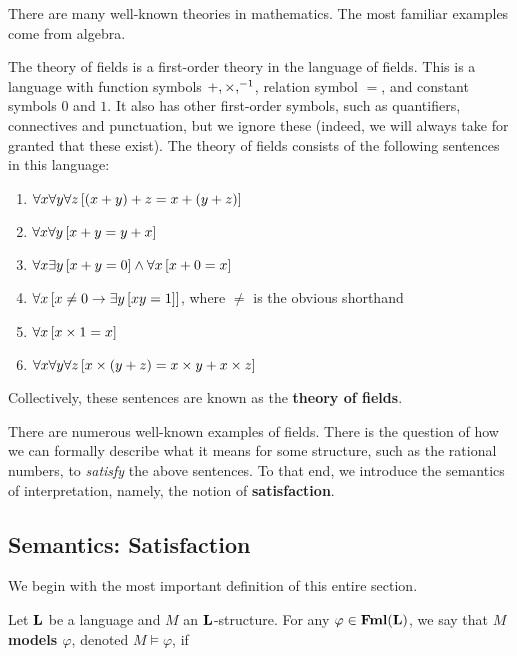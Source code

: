 There are many well-known theories in mathematics. The most familiar examples come from algebra.

\begin{boxexample}\label{Ch1:Eg:Thy_of_Fields}
    The theory of fields is a first-order theory in the language of fields. This is a language with function symbols $+, \times, ^{-1}$, relation symbol $=$, and constant symbols $0$ and $1$. It also has other first-order symbols, such as quantifiers, connectives and punctuation, but we ignore these (indeed, we will always take for granted that these exist). The theory of fields consists of the following sentences in this language:
    \begin{enumerate}
        \item $\forall x \forall y \forall z \left[ \left( x + y \right) + z = x + \left( y + z \right) \right]$
        \item $\forall x \forall y \left[ x + y = y + x \right]$
        \item $\forall x \exists y \left[ x + y = 0 \right] \land \forall x \left[ x + 0 = x \right]$
        \item $\forall x \left[ x \neq 0 \to \exists y \left[ x y = 1 \right] \right]$, where $\neq$ is the obvious shorthand
        \item $\forall x \left[ x \times 1 = x \right]$
        \item $\forall x \forall y \forall z \left[ x \times \left( y + z \right) = x \times y + x \times z \right]$
    \end{enumerate}
    Collectively, these sentences are known as the \textbf{theory of fields}.
\end{boxexample}

There are numerous well-known examples of fields. There is the question of how we can formally describe what it means for some structure, such as the rational numbers, to \textit{satisfy} the above sentences. To that end, we introduce the semantics of interpretation, namely, the notion of \textbf{satisfaction}.

\subsection{Semantics: Satisfaction}

We begin with the most important definition of this entire section.

\begin{boxdefinition}
    Let $\mathbf{L}$ be a language and $M$ an $\mathbf{L}$-structure. For any $\varphi \in \mathbf{Fml}\!\left( \mathbf{L} \right)$, we say that \textbf{$M$ models $\varphi$}, denoted $M \models \varphi$, if \sorry %
\end{boxdefinition}

